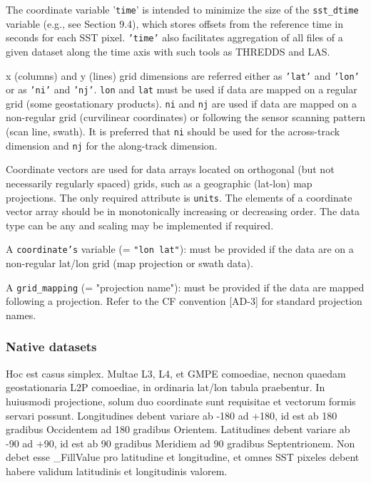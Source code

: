 The coordinate variable '\texttt{time}' is intended to minimize the size of the \texttt{sst\_dtime} variable (e.g., see
Section 9.4), which stores offsets from the reference time in seconds for each SST pixel. \texttt{'time'} also
facilitates aggregation of all files of a given dataset along the time axis with such tools as THREDDS
and LAS.
\par \vspace{0.1in}

x (columns) and y (lines) grid dimensions are referred either as \texttt{'lat'} and \texttt{'lon'} or as \texttt{'ni'} and \texttt{'nj'}.
\texttt{lon} and \texttt{lat} must be used if data are mapped on a regular grid (some geostationary products). \texttt{ni}
and \texttt{nj} are used if data are mapped on a non-regular grid (curvilinear coordinates) or following the 
sensor scanning pattern (scan line, swath). It is preferred that \texttt{ni} should be used for the across-track
dimension and \texttt{nj} for the along-track dimension.
\par \vspace{0.1in}

Coordinate vectors are used for data arrays located on orthogonal (but not necessarily regularly
spaced) grids, such as a geographic (lat-lon) map projections. The only required attribute is \texttt{units}.
The elements of a coordinate vector array should be in monotonically increasing or decreasing order.
The data type can be any and scaling may be implemented if required.
\par \vspace{0.1in}

A \texttt{coordinate's} variable (= \texttt{"lon lat"}): must be provided if the data are on a non-regular lat/lon
grid (map projection or swath data).
\par \vspace{0.1in}

A \texttt{grid\_mapping} (= "projection name"): must be provided if the data are mapped following a
projection. Refer to the CF convention [AD-3] for standard projection names. 
\par
\pagebreak

\subsubsection{Native datasets}
Hoc est casus simplex. Multae L3, L4, et GMPE comoediae, necnon quaedam geostationaria L2P comoediae, in ordinaria lat/lon tabula praebentur. In huiusmodi projectione, solum duo coordinate sunt requisitae et vectorum formis servari possunt. Longitudines debent variare ab -180 ad +180, id est ab 180 gradibus Occidentem ad 180 gradibus Orientem. Latitudines debent variare ab -90 ad +90, id est ab 90 gradibus Meridiem ad 90 gradibus Septentrionem. Non debet esse \_FillValue pro latitudine et longitudine, et omnes SST pixeles debent habere validum latitudinis et longitudinis valorem.
\par \vspace{0.1in}

